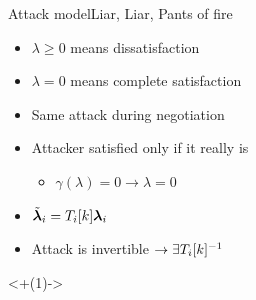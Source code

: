 \documentclass[handout,aspectratio=169]{beamer}
\begin{document}
\begin{frame}{Attack model}{Liar, Liar, Pants of fire}
  \begin{minipage}[c]{.5\linewidth}
    \begin{itemize}[<+(1)->]
      \item $\lambda\ge 0$ means dissatisfaction
      \item $\lambda=0$ means complete satisfaction
    \end{itemize}
    \pause
    \begin{assumptions}
      \begin{itemize}[<+(1)->]
        \item Same attack during negotiation
        \item Attacker satisfied only if it really is
              \begin{itemize}
                \item $\gamma(\lambda)=0\rightarrow \lambda=0$
              \end{itemize}
        \item $\tilde{\boldsymbol{\lambda}}_{i}=T_{i}[k]\boldsymbol{\lambda}_{i}$
      \end{itemize}
    \end{assumptions}
    \begin{itemize}[<+(1)->]
      \item Attack is invertible $\to \exists T_{i}[k]^{-1}$
    \end{itemize}
  \end{minipage}
  \hfill
  \begin{minipage}[c]{.4\linewidth}
    \onslide<+(1)->{
    }
  \end{minipage}
\end{frame}
\end{document}
